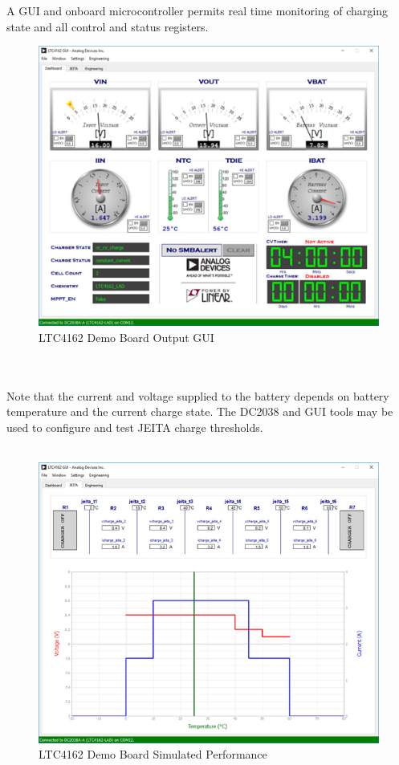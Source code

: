 \documentclass[12pt]{article}
\begin{document}
\indent
A GUI and onboard microcontroller permits real time monitoring of charging state and all control and status registers.\\
\hfill
\begin{figure}[h!]
\centering
\includegraphics[width=0.9\linewidth]{demo_board_output}
\caption{LTC4162 Demo Board Output GUI \cite{demoDC2038A}}
\end{figure}
\hfill \\
\pagebreak
\hfill \\
\indent
Note that the current and voltage supplied to the battery depends on battery temperature and the current charge state. The DC2038 and GUI tools may be used to configure and test JEITA charge thresholds.\\
\hfill \\
\begin{figure}[h!]
\centering
\includegraphics[width=0.9\linewidth]{demo_board_result}
\caption{LTC4162 Demo Board Simulated  Performance \cite{demoDC2038A}}
\end{figure}
\end{document}
